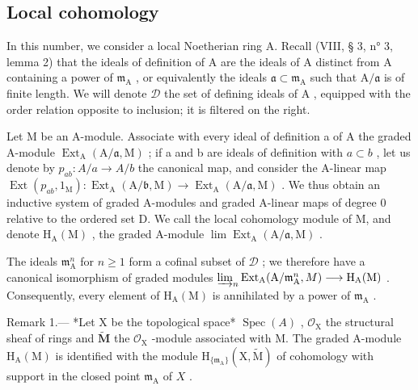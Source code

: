 \subsection{Local cohomology}

In this number, we consider a local Noetherian ring A. Recall (VIII, § 3, n° 3, lemma 2) that the ideals of definition of A are the ideals of A distinct from A containing a power of \(\mathfrak{m}_{\mathrm{A}}\) , or equivalently the ideals \(\mathfrak{a} \subset \mathfrak{m}_{\mathrm{A}}\) such that \(\mathrm{A}/\mathfrak{a}\) is of finite length. We will denote \(\mathcal{D}\) the set of defining ideals of \(\mathrm{A}\) , equipped with the order relation opposite to inclusion; it is filtered on the right.

Let M be an A-module. Associate with every ideal of definition a of A the graded A-module \(\operatorname{Ext}_{\mathrm{A}}(\mathrm{A}/\mathfrak{a},\mathrm{M})\) ; if a and b are ideals of definition with \(a \subset b\) , let us denote by \(p_{ab}: A/a \to A/b\) the canonical map, and consider the A-linear map \(\operatorname{Ext}(p_{ab},1_{\mathrm{M}}): \operatorname{Ext}_{\mathrm{A}}(\mathrm{A}/\mathfrak{b},\mathrm{M}) \longrightarrow \operatorname{Ext}_{\mathrm{A}}(\mathrm{A}/\mathfrak{a},\mathrm{M})\) . We thus obtain an inductive system of graded A-modules and graded A-linear maps of degree 0 relative to the ordered set D. We call the local cohomology module of M, and denote \(\mathrm{H}_{\mathrm{A}}(\mathrm{M})\) , the graded A-module \(\lim \operatorname{Ext}_{\mathrm{A}}(\mathrm{A}/\mathfrak{a},\mathrm{M})\) .

The ideals \(\mathfrak{m}_{\mathrm{A}}^{n}\) for \(n \geqslant 1\) form a cofinal subset of \(\mathcal{D}\) ; we therefore have a canonical isomorphism of graded modules \(\varinjlim_{n} \operatorname{Ext}_{\mathrm{A}}(\mathrm{A}/\mathfrak{m}_{\mathrm{A}}^{n}, M) \longrightarrow \mathrm{H}_{\mathrm{A}}(\mathrm{M})\) . Consequently, every element of \(\mathrm{H}_{\mathrm{A}}(\mathrm{M})\) is annihilated by a power of \(\mathfrak{m}_{\mathrm{A}}\) .

Remark 1.--- *Let X be the topological space* \(\operatorname{Spec}(A)\) , \(\mathcal{O}_{\mathrm{X}}\) the structural sheaf of rings and \(\widetilde{\mathbf{M}}\) the \(\mathcal{O}_{\mathrm{X}}\) -module associated with M. The graded A-module \(\mathrm{H}_{\mathrm{A}}(\mathrm{M})\) is identified with the module \(\mathrm{H}_{\{\mathfrak{m}_{\mathrm{A}}\}}(\mathrm{X},\widetilde{\mathrm{M}})\) of cohomology with support in the closed point \(\mathfrak{m}_{\mathrm{A}}\) of \(X\) .

